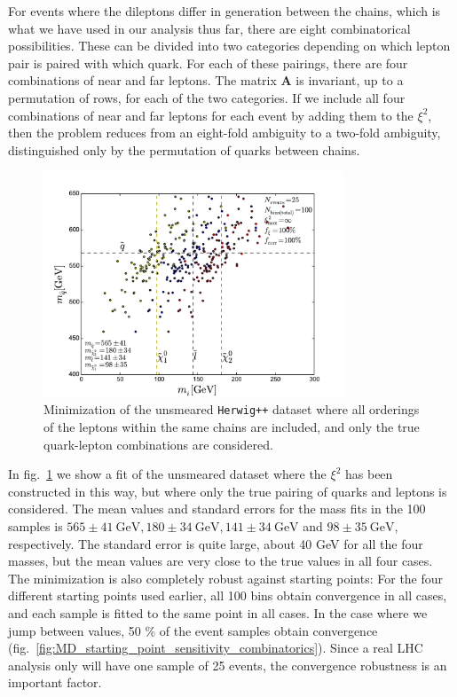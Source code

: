 \documentclass[twoside,english]{uiofysmaster}
\begin{document}
For events where the dileptons differ in generation between the chains, which is what we have used in our analysis thus far, there are eight combinatorical possibilities. These can be divided into two categories depending on which lepton pair is paired with which quark. For each of these pairings, there are four combinations of near and far leptons. The matrix $\mathbf{A}$ is invariant, up to a permutation of rows, for each of the two categories. If we include all four combinations of near and far leptons for each event by adding them to the $\xi^2$, then the problem reduces from an eight-fold ambiguity to a two-fold ambiguity, distinguished only by the permutation of quarks between chains. 
\begin{figure}[hbt]
	\centering
	\includegraphics[width=0.8\textwidth]{figures/improving_combinatorics/herwigpp-4combosum-fit-nocomb-nosmear-nocut.pdf} 
	\caption{Minimization of the unsmeared {\tt Herwig++} dataset where all orderings of the leptons within the same chains are included, and only the true quark-lepton combinations are considered.}
	\label{fig:4combosum_nocomb-nosmear}
\end{figure}
In fig.\ \ref{fig:4combosum_nocomb-nosmear} we show a fit of the unsmeared dataset where the $\xi^2$ has been constructed in this way, but where only the true pairing of quarks and leptons is considered. The mean values and standard errors for the mass fits in the 100 samples is $565 \pm 41~\mathrm{GeV}, 180 \pm 34~\mathrm{GeV}, 141 \pm 34~\mathrm{GeV}$ and $98 \pm 35~\mathrm{GeV}$, respectively. The standard error is quite large, about 40 GeV for all the four masses, but the mean values are very close to the true values in all four cases. The minimization is also completely robust against starting points: For the four different starting points used earlier, all 100 bins obtain convergence in all cases, and each sample is fitted to the same point in all cases. In the case where we jump between values, 50 \% of the event samples obtain convergence (fig.\ \ref{fig:MD_starting_point_sensitivity_combinatorics}). Since a real LHC analysis only will have one sample of 25 events, the convergence robustness is an important factor. 
\end{document}
